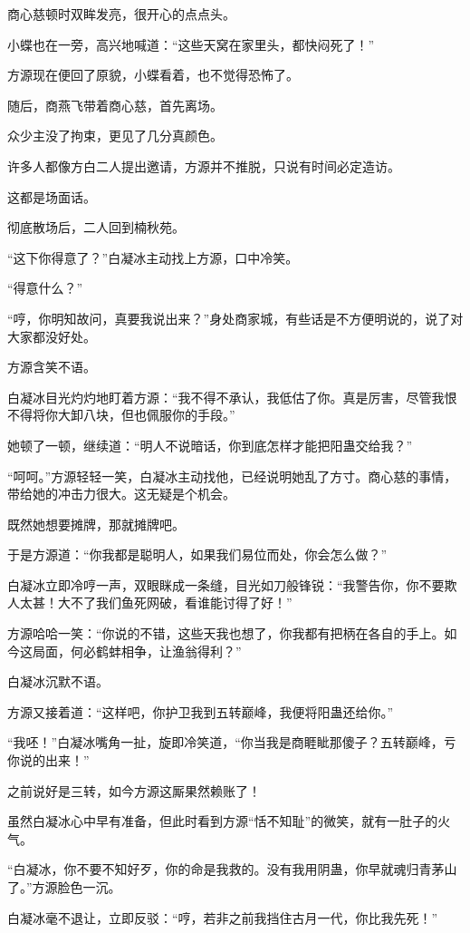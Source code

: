 \begin{this_body}
商心慈顿时双眸发亮，很开心的点点头。

小蝶也在一旁，高兴地喊道：“这些天窝在家里头，都快闷死了！”

方源现在便回了原貌，小蝶看着，也不觉得恐怖了。

随后，商燕飞带着商心慈，首先离场。

众少主没了拘束，更见了几分真颜色。

许多人都像方白二人提出邀请，方源并不推脱，只说有时间必定造访。

这都是场面话。

彻底散场后，二人回到楠秋苑。

“这下你得意了？”白凝冰主动找上方源，口中冷笑。

“得意什么？”

“哼，你明知故问，真要我说出来？”身处商家城，有些话是不方便明说的，说了对大家都没好处。

方源含笑不语。

白凝冰目光灼灼地盯着方源：“我不得不承认，我低估了你。真是厉害，尽管我恨不得将你大卸八块，但也佩服你的手段。”

她顿了一顿，继续道：“明人不说暗话，你到底怎样才能把阳蛊交给我？”

“呵呵。”方源轻轻一笑，白凝冰主动找他，已经说明她乱了方寸。商心慈的事情，带给她的冲击力很大。这无疑是个机会。

既然她想要摊牌，那就摊牌吧。

于是方源道：“你我都是聪明人，如果我们易位而处，你会怎么做？”

白凝冰立即冷哼一声，双眼眯成一条缝，目光如刀般锋锐：“我警告你，你不要欺人太甚！大不了我们鱼死网破，看谁能讨得了好！”

方源哈哈一笑：“你说的不错，这些天我也想了，你我都有把柄在各自的手上。如今这局面，何必鹤蚌相争，让渔翁得利？”

白凝冰沉默不语。

方源又接着道：“这样吧，你护卫我到五转巅峰，我便将阳蛊还给你。”

“我呸！”白凝冰嘴角一扯，旋即冷笑道，“你当我是商睚眦那傻子？五转巅峰，亏你说的出来！”

之前说好是三转，如今方源这厮果然赖账了！

虽然白凝冰心中早有准备，但此时看到方源“恬不知耻”的微笑，就有一肚子的火气。

“白凝冰，你不要不知好歹，你的命是我救的。没有我用阴蛊，你早就魂归青茅山了。”方源脸色一沉。

白凝冰毫不退让，立即反驳：“哼，若非之前我挡住古月一代，你比我先死！”


\end{this_body}
